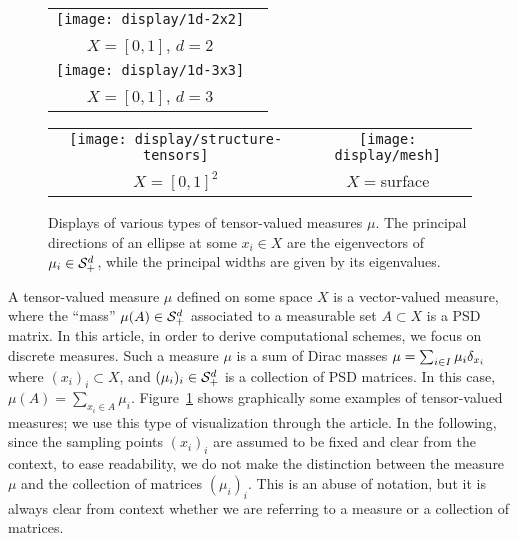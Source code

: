 \begin{figure}\centering
\begin{minipage}[c]{.48\linewidth}
\begin{tabular}{@{}c@{}c@{}}
{\texttt{[image: display/1d-2x2]}}\\
$X=[0,1]$, $d=2$ \\[2mm]
{\texttt{[image: display/1d-3x3]}} \\
$X=[0,1]$, $d=3$
\end{tabular}
\end{minipage} 
\begin{minipage}[c]{.49\linewidth}
\begin{tabular}{@{}c@{}c@{}}
\texttt{[image: display/structure-tensors]}&
\texttt{[image: display/mesh]}\\
 $X=[0,1]^2$ & $X=$surface \\
\end{tabular}
   \end{minipage}
\caption{Displays of various types of tensor-valued measures $\mu$. The principal directions of an ellipse at some $x_i \in X$ are the eigenvectors of $\mu_i \in \mathcal{S}_+^d$, while the principal widths are given by its eigenvalues. 
} \label{fig:display}
\end{figure}


A tensor-valued measure $\mu$ defined on some space $X$ is a vector-valued measure, where the ``mass'' $\mu(A) \in \mathcal{S}_+^d$ associated to a measurable set $A \subset X$ is a PSD matrix. In this article, in order to derive computational schemes, we focus on discrete measures. Such a measure $\mu$ is a sum of Dirac masses
$\mu = \sum_{i \in I} \mu_i \delta_{x_i}$
where $(x_i)_i \subset X$, and $(\mu_i)_i \in \mathcal{S}_+^d$ is a collection of PSD matrices. In this case, $\mu(A)=\sum_{x_i \in A} \mu_i$. 
%
Figure~\ref{fig:display} shows graphically some examples of tensor-valued measures; we use this type of visualization through the article. 
%
In the following, since the sampling points $(x_i)_i$ are assumed to be fixed and clear from the context, to ease readability, we do not make the distinction between the measure $\mu$ and the collection of matrices $(\mu_i)_i$. This is an abuse of notation, but it is always clear from context whether we are referring to a measure or a collection of matrices. 


